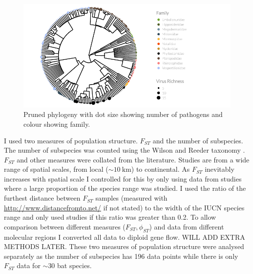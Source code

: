 \begin{knitrout}\footnotesize
{}\color{fgcolor}\begin{figure}[t]

{\centering \includegraphics[width=\textwidth]{figure/treePlot-1} 

}

\caption[Pruned phylogeny with dot size showing number of pathogens and colour showing family]{Pruned phylogeny with dot size showing number of pathogens and colour showing family.}\label{fig:treePlot}
\end{figure}


\end{knitrout}












I used two measures of population structure. 
$F_{ST}$ and the number of subspecies.
The number of subspecies was counted using the Wilson and Reeder taxonomy \cite{wilson2005mammal}.
$F_{ST}$ and other measures were collated from the literature.
Studies are from a wide range of spatial scales, from local ($\sim\SI{10}{\kilo\metre}$) to continental.
As $F_{ST}$ inevitably increases with spatial scale I controlled for this by only using data from studies where a large proportion of the species range was studied.
I used the ratio of the furthest distance between $F_{ST}$ samples (measured with \url{http://www.distancefromto.net/} if not stated) to the width of the IUCN species range and only used studies if this ratio was greater than 0.2.
To allow comparison between different measures ($F_{ST}, \phi_{ST}$) and data from different molecular regions I converted all data to diploid gene flow.
WILL ADD EXTRA METHODS LATER.
These two measures of population structure were analysed separately as the number of subspecies has 196 data points while there is only $F_{ST}$ data for $\sim 30$ bat species.

